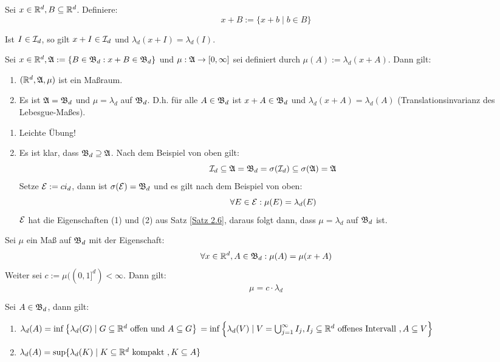 \documentclass[a4paper,twoside,DIV15,BCOR12mm,chapterprefix=true,headings=onelinechapter]{scrbook}
\begin{document}
\begin{definition}
Sei $x\in\mathbb{R}^d, B\subseteq\mathbb{R}^d$. Definiere:
\[x+B:=\{x+b\mid b\in B\}\]
\end{definition}

\begin{beispiel}
Ist $I\in\mathcal{I}_d$, so gilt $x+I\in\mathcal{I}_d$ und $\lambda_d(x+I)=\lambda_d(I)$.
\end{beispiel}

\begin{satz}
\label{Satz 2.8}
Sei $x\in\mathbb{R}^d, \mathfrak{A}:=\{B\in\mathfrak{B}_d:x+B\in\mathfrak{B}_d\}$ und $\mu:\mathfrak{A}\to[0,\infty]$ sei definiert durch $\mu(A):=\lambda_d(x+A)$. Dann gilt:
\begin{enumerate}
\item $(\mathbb{R}^d,\mathfrak{A},\mu)$ ist ein Maßraum.
\item Es ist $\mathfrak{A}=\mathfrak{B}_d$ und $\mu=\lambda_d$ auf $\mathfrak{B}_d$. D.h. für alle $A\in\mathfrak{B}_d$ ist $x+A\in\mathfrak{B}_d$ und $\lambda_d(x+A)=\lambda_d(A)$ (Translationsinvarianz des Lebesgue-Maßes).
\end{enumerate}
\end{satz}

\begin{beweis}
\begin{enumerate}
\item Leichte Übung!
\item Es ist klar, dass $\mathfrak{B}_d\supseteq\mathfrak{A}$. Nach dem Beispiel von oben gilt:
\[\mathcal{I}_d\subseteq\mathfrak{A}=\mathfrak{B}_d=\sigma(\mathcal{I}_d)\subseteq\sigma(\mathfrak{A})=\mathfrak{A}\]
Setze $\mathcal{E}:=ci_d$, dann ist $\sigma(\mathcal{E})=\mathfrak{B}_d$ und es gilt nach dem Beispiel von oben:
\[\forall E\in\mathcal{E}:\mu(E)=\lambda_d(E)\]
$\mathcal{E}$ hat die Eigenschaften (1) und (2) aus Satz \ref{Satz 2.6}, daraus folgt dann, dass $\mu=\lambda_d$ auf $\mathfrak{B}_d$ ist.
\end{enumerate}
\end{beweis}

\begin{satz}
\label{Satz 2.9}
Sei $\mu$ ein Maß auf $\mathfrak{B}_d$ mit der Eigenschaft:
\[\forall x\in\mathbb{R}^d, A\in\mathfrak{B}_d:\mu(A)=\mu(x+A)\]
Weiter sei $c:=\mu((0,1]^d)<\infty$. Dann gilt:
\[\mu=c\cdot\lambda_d\]
\end{satz}

\begin{satz}
\label{Satz 2.10}
Sei $A \in\mathfrak{B}_d$, dann gilt:
\begin{enumerate}
\item
$\lambda_d(A)=\inf\left\{\lambda_d(G)\mid G\subseteq\mathbb{R}^d\text{ offen und }A \subseteq G\right\}\\
 =\inf\left\{\lambda_d(V)\mid V=\bigcup_{j=1}^\infty I_j, I_j\subseteq\mathbb{R}^d\text{ offenes Intervall }, A\subseteq V\right\}$
\item $\lambda_d(A)=\sup\{\lambda_d(K)\mid K\subseteq\mathbb{R}^d\text{ kompakt }, K\subseteq A\}$
\end{enumerate}
\end{satz}
\end{document}
